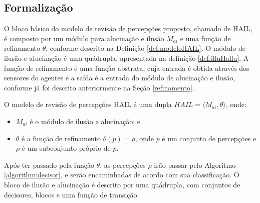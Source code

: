 \subsection{Formalização}

\label{section:formalizacao}

O bloco básico do modelo de revisão de percepções proposto, chamado de HAIL, é composto por um módulo para alucinação e ilusão $M_{ai}$ e uma função de refinamento $\theta$, conforme descrito na Definição \ref{def:modeloHAIL}. O módulo de ilusão e alucinação é uma quádrupla, apresentada na definição \ref{def:illuHallu}. A função de refinamento é uma função abstrata, cuja entrada é obtida através dos sensores do agentes e a saída é a entrada do módulo de alucinação e ilusão, conforme já foi descrito anteriormente na Seção \ref{refinamento}.
 
 \vspace{0.2cm}
 
 \begin{definition}{}
    O modelo de revisão de percepções HAIL é uma dupla $HAIL = \langle M_{ai}, \theta \rangle$, onde:
    
    \begin{itemize}
        \item $M_{ai}$ é o módulo de ilusão e alucinação; e
        \item $\theta$ é a função de refinamento $\theta(p) = \rho$, onde $p$ é um conjunto de percepções e $\rho$ é um subconjunto próprio de $p$.
    \end{itemize}{}
    \label{def:modeloHAIL}
\end{definition}

Após ter passado pela função $\theta$, as percepções $\rho$ irão passar pelo Algoritmo \ref{algorithm:decisor}, e serão encaminhadas de acordo com sua classificação. O bloco de ilusão e alucinação é descrito por uma quádrupla, com conjuntos de decisores, blocos e uma função de transição.

\vspace{0.2cm}

